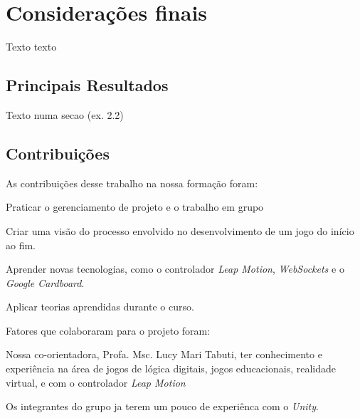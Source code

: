 
\chapter{Considerações finais}\label{cap-consideracoes-finais}

Texto texto

\section{Principais Resultados}\label{sec-conc-resultados}

Texto numa secao (ex. 2.2)

\section{Contribuições}\label{sec-conc-contribuicoes}

As contribuições desse trabalho na nossa formação foram:

\begin{alineas}
	\item Praticar o gerenciamento de projeto e o trabalho em grupo
	\item Criar uma visão do processo envolvido no desenvolvimento de um jogo do início ao fim.
	\item Aprender novas tecnologias, como o controlador \textit{Leap Motion}, \textit{WebSockets} e o \textit{Google Cardboard}.
	\item Aplicar teorias aprendidas durante o curso.
\end{alineas}

Fatores que colaboraram para o projeto foram:

\begin{alineas}
	\item Nossa co-orientadora, Profa. Msc. Lucy Mari Tabuti, ter conhecimento e experiência na área de jogos de lógica digitais, jogos educacionais, realidade virtual, e com o controlador \textit{Leap Motion}
	\item Os integrantes do grupo ja terem um pouco de experiênca com o \textit{Unity}.
\end{alineas}

